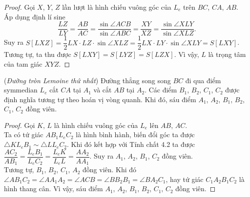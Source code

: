         \begin{proof}
            Gọi \(X\), \(Y\), \(Z\) lần lượt là hình chiếu vuông góc của \(L_e\) trên \(BC\), \(CA\), \(AB\).\\
            Áp dụng định lí sine
            \[\frac{LZ}{LY} = \frac{AB}{AC} = \frac{\sin \angle ACB}{\sin \angle ABC} = \frac{XY}{XZ} = \frac{\sin \angle XLY}{\sin \angle XLZ}.\]
            Suy ra \(S[LXZ] = \dfrac{1}{2} LX \cdot LZ \cdot \sin \angle XLZ = \dfrac{1}{2} LX \cdot LY \cdot \sin \angle XLY = S[LXY]\). Tương tự, ta thu được \(S[LXY] = S[LYZ] = S[LZX]\). Vì vậy, \(L\) là trọng tâm của tam giác \(XYZ\).
        \end{proof}

        \begin{property}
            (\textit{Đường tròn Lemoine thứ nhất}) Đường thẳng song song \(BC\) đi qua điểm symmedian \(L_e\) cắt \(CA\) tại \(A_1\) và cắt \(AB\) tại \(A_2\). Các điểm \(B_1\), \(B_2\), \(C_1\), \(C_2\) được định nghĩa tương tự theo hoán vị vòng quanh. Khi đó, sáu điểm \(A_1\), \(A_2\), \(B_1\), \(B_2\), \(C_1\), \(C_2\) đồng viên.
        \end{property}

        \begin{proof}
            Gọi \(K\), \(L\) là hình chiếu vuông góc của \(L_e\) lên \(AB\), \(AC\).\\
            Ta có tứ giác \(AB_1L_eC_2\) là hình bình hành, biến đổi góc ta được \(\triangle KL_eB_1 \sim \triangle LL_eC_2\). Khi đó kết hợp với Tính chất 4.2 ta được \(\dfrac{AC_2}{AB_1} = \dfrac{L_eB_1}{L_eC_2} = \dfrac{L_eK}{L_eL} = \dfrac{AA_2}{AA_1}\). Suy ra \(A_1\), \(A_2\), \(B_1\), \(C_2\) đồng viên.\\
            Tương tự, \(B_1\), \(B_2\), \(C_1\), \(A_2\) đồng viên. Khi đó \(\angle AB_1C_2 = \angle AA_1A_2 = \angle ACB = \angle BB_2B_1 = \angle BA_2C_1\), hay tứ giác \(C_1A_2B_1C_2\) là hình thang cân. Vì vậy, sáu điểm \(A_1\), \(A_2\), \(B_1\), \(B_2\), \(C_1\), \(C_2\) đồng viên.
        \end{proof}

